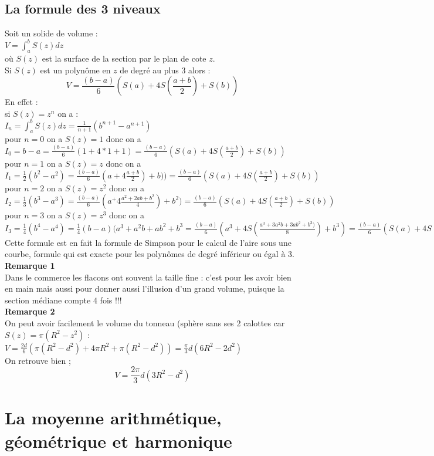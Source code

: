 \documentclass[a4paper,11pt]{book}
\begin{document}
\subsection{La formule des 3 niveaux}
Soit un solide de volume :\\
$V=\int_a^b S(z) dz$ \\
o\`u $S(z)$ est la surface de la section par le plan de cote $z$.\\
Si $S(z)$ est un polyn\^ome en $z$ de degr\'e au plus 3 alors :
$$V=\frac{(b-a)}{6}(S(a)+4S(\frac{a+b}{2})+S(b))$$
En effet :\\
si $S(z)=z^n$ on a :\\
$I_n=\int_a^b S(z) dz=\frac{1}{n+1}(b^{n+1}-a^{n+1})$\\
pour $n=0$ on a $S(z)=1$ donc on a $I_0=b-a=\frac{(b-a)}{6}(1+4*1+1)=\frac{(b-a)}{6}(S(a)+4S(\frac{a+b}{2})+S(b))$\\
pour $n=1$ on a $S(z)=z$ donc on a $I_1=\frac{1}{2}(b^2-a^2)=\frac{(b-a)}{6}(a+4\frac{a+b}{2})+b))=\frac{(b-a)}{6}(S(a)+4S(\frac{a+b}{2})+S(b))$\\
pour $n=2$ on a $S(z)=z^2$ donc on a $I_2=\frac{1}{3}(b^3-a^3)=\frac{(b-a)}{6}(a^+4\frac{a^2+2ab+b^2}{4})+b^2)=\frac{(b-a)}{6}(S(a)+4S(\frac{a+b}{2})+S(b))$\\
pour $n=3$ on a $S(z)=z^3$ donc on a $I_3=\frac{1}{4}(b^4-a^4)=\frac{1}{4}(b-a)(a^3+a^2b+ab^2+b^3=\frac{(b-a)}{6}(a^3+4S(\frac{a^3+3a^2b+3ab^2+b^3)}{8})+b^3)=\frac{(b-a)}{6}(S(a)+4S(\frac{a+b}{2})+S(b))$\\
Cette formule est en fait la formule de Simpson pour le calcul de l'aire sous une courbe, formule qui est exacte pour les polyn\^omes de degr\'e inf\'erieur ou \'egal \`a 3.\\
{\bf Remarque 1}\\
Dans le commerce les flacons ont souvent la taille fine : c'est pour les avoir 
bien en main mais aussi pour donner aussi l'illusion d'un grand volume, puisque
la section m\'ediane compte 4 fois !!! \\
{\bf Remarque 2}\\
On peut avoir facilement le volume du tonneau (sph\`ere sans ses 2 calottes car $S(z)=\pi(R^2-z^2)$ :\\
$V=\frac{2d}{6}(\pi(R^2-d^2)+4\pi R^2+\pi(R^2-d^2))=\frac{\pi}{3}d(6R^2-2d^2)$\\
On retrouve bien ;\\
$$V=\frac{2\pi}{3}d(3R^2-d^2)$$

\section{La moyenne arithm\'etique, g\'eom\'etrique et harmonique}
\end{document}
